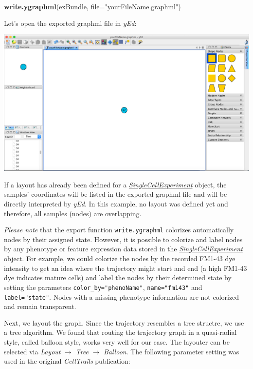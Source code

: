\documentclass[]{book}
\newenvironment{Shaded}{\begin{snugshade}}{\end{snugshade}}
\newcommand{\KeywordTok}[1]{\textcolor[rgb]{0.13,0.29,0.53}{\textbf{#1}}}
\newcommand{\DataTypeTok}[1]{\textcolor[rgb]{0.13,0.29,0.53}{#1}}
\newcommand{\StringTok}[1]{\textcolor[rgb]{0.31,0.60,0.02}{#1}}
\newcommand{\NormalTok}[1]{#1}
\theoremstyle{definition}
\theoremstyle{definition}
\theoremstyle{definition}
\theoremstyle{remark}
\begin{document}
\begin{Shaded}
\begin{Highlighting}[]
\KeywordTok{write.ygraphml}\NormalTok{(exBundle, }\DataTypeTok{file=}\StringTok{"yourFileName.graphml"}\NormalTok{)}
\end{Highlighting}
\end{Shaded}

Let's open the exported graphml file in \emph{yEd}:

\includegraphics[width=0.7\linewidth]{img/yEd_1}

If a layout has already been defined for a
\emph{\href{http://bioconductor.org/packages/SingleCellExperiment}{SingleCellExperiment}}
object, the samples' coordinates will be listed in the exported graphml
file and will be directly interpreted by \emph{yEd}. In this example, no
layout was defined yet and therefore, all samples (nodes) are
overlapping.

\emph{Please note} that the export function \texttt{write.ygraphml}
colorizes automatically nodes by their assigned state. However, it is
possible to colorize and label nodes by any phenotype or feature
expression data stored in the
\emph{\href{http://bioconductor.org/packages/SingleCellExperiment}{SingleCellExperiment}}
object. For example, we could colorize the nodes by the recorded FM1-43
dye intensity to get an idea where the trajectory might start and end (a
high FM1-43 dye indicates mature cells) and label the nodes by their
determined state by setting the parameters
\texttt{color\_by="phenoName"}, \texttt{name="fm143"} and
\texttt{label="state"}. Nodes with a missing phenotype information are
not colorized and remain transparent.

Next, we layout the graph. Since the trajectory resembles a tree
structre, we use a tree algorithm. We found that routing the trajectory
graph in a quasi-radial style, called balloon style, works very well for
our case. The layouter can be selected via \emph{Layout} \(\rightarrow\)
\emph{Tree} \(\rightarrow\) \emph{Balloon}. The following parameter
setting was used in the original \emph{CellTrails} publication:
\end{document}
